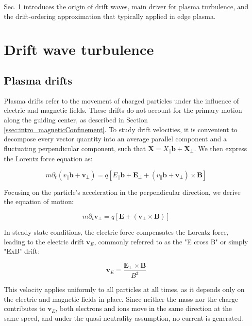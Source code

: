 Sec. \ref{sec:edge_driftWaves} introduces the origin of drift waves, main driver for plasma turbulence, and the drift-ordering approximation that typically applied in edge plasma. 

\section{Drift wave turbulence}
\label{sec:edge_driftWaves}

\subsection{Plasma drifts}
\label{ssec:edge_plasmaDrifts}

Plasma drifts refer to the movement of charged particles under the influence of electric and magnetic fields. These drifts do not account for the primary motion along the guiding center, as described in Section \ref{ssec:intro_magneticConfinement}. To study drift velocities, it is convenient to decompose every vector quantity into an average parallel component and a fluctuating perpendicular component, such that $\mathbf{X} = X_\parallel\mathbf{b} + \mathbf{X_\perp}$. We then express the Lorentz force equation as:

\begin{equation}
	\label{eq:edge_LorentzEquationDecomposition}
	m\partial_t\left(v_\parallel\mathbf{b} + \mathbf{v}_\perp\right) = q\left[E_\parallel\mathbf{b} + \mathbf{E}_\perp + \left(v_\parallel\mathbf{b} + \mathbf{v}_\perp\right) \times \mathbf{B}\right]
\end{equation}

Focusing on the particle's acceleration in the perpendicular direction, we derive the equation of motion:

\begin{equation}
	\label{eq:edge_EcrossBdrift}
	m\partial_t \mathbf{v}_\perp = q\left[\mathbf{E} + \left(\mathbf{v}_\perp \times \mathbf{B}\right)\right]
\end{equation}

In steady-state conditions, the electric force compensates the Lorentz force, leading to the electric drift $\mathbf{v}_E$, commonly referred to as the "E cross B" or simply "ExB" drift:

\begin{equation}
	\mathbf{v}_E = \frac{\mathbf{E}_\perp \times \mathbf{B}}{B^2}
\end{equation}

This velocity applies uniformly to all particles at all times, as it depends only on the electric and magnetic fields in place. Since neither the mass nor the charge contributes to $\mathbf{v}_E$, both electrons and ions move in the same direction at the same speed, and under the quasi-neutrality assumption, no current is generated.

